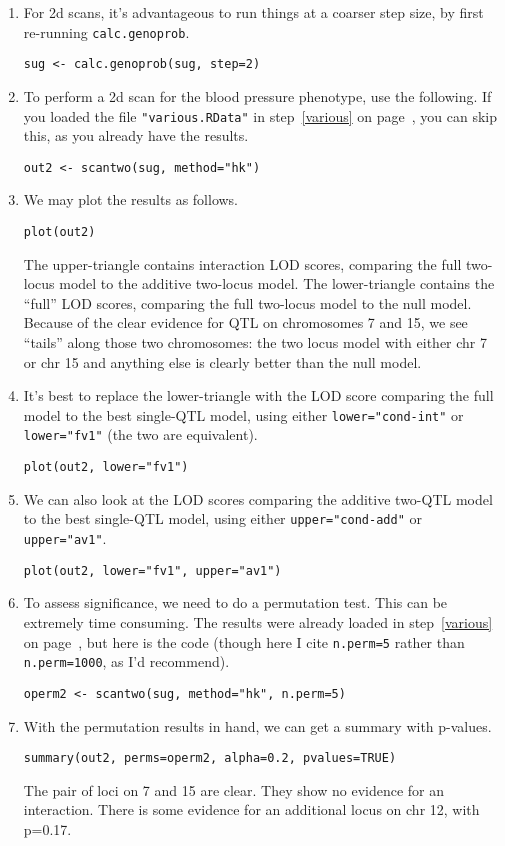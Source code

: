 \documentclass[10pt,letterpaper]{article}
\newcommand{\usercolor}{\color [named]{BlueViolet}}
\begin{document}
\begin{enumerate}
\addtocounter{enumi}{46}
\item For 2d scans, it's advantageous to run things at a coarser step
  size, by first re-running \verb-calc.genoprob-.

\usercolor
\verb|sug <- calc.genoprob(sug, step=2)|
\normalcolor

\item To perform a 2d scan for the blood pressure phenotype, use the
  following.  If you loaded the file \verb-"various.RData"- in
  step~\ref{various} on page~\pageref{various},
  you can skip this, as you already have the results.

\usercolor
\verb|out2 <- scantwo(sug, method="hk")|
\normalcolor

\item We may plot the results as follows.

\usercolor
\verb|plot(out2)|
\normalcolor

The upper-triangle contains interaction LOD scores, comparing the full
two-locus model to the additive two-locus model.  The lower-triangle
contains the ``full'' LOD scores, comparing the full two-locus model
to the null model.  Because of the clear evidence for QTL on
chromosomes 7 and 15, we see ``tails'' along those two chromosomes:
the two locus model with either chr 7 or chr 15 and anything else is clearly better
than the null model.  

\item It's best to replace the lower-triangle with the LOD score comparing the full model to
  the best single-QTL model, using either \verb:lower="cond-int": or
  \verb:lower="fv1": (the two are equivalent).

\usercolor
\verb|plot(out2, lower="fv1")|
\normalcolor

\item We can also look at the LOD scores comparing the additive
  two-QTL model to the best single-QTL model, using either
  \verb:upper="cond-add": or \verb:upper="av1":.

\usercolor
\verb|plot(out2, lower="fv1", upper="av1")|
\normalcolor

\item To assess significance, we need to do a permutation test.  This
  can be extremely time consuming.  The results were already loaded in
  step~\ref{various} on page~\pageref{various}, but here is the code (though here I cite \verb:n.perm=5:
  rather than \verb:n.perm=1000:, as I'd recommend).

\usercolor
\verb|operm2 <- scantwo(sug, method="hk", n.perm=5)|
\normalcolor

\item With the permutation results in hand, we can get a summary with
  p-values.

\usercolor
\verb|summary(out2, perms=operm2, alpha=0.2, pvalues=TRUE)|
\normalcolor

The pair of loci on 7 and 15 are clear.  They show no evidence for an
interaction.  There is some evidence for an additional locus on chr
12, with p=0.17.

\end{enumerate}
\end{document}
